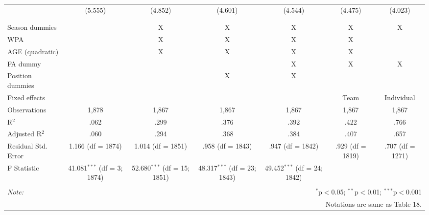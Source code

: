 \begin{table}[H]
\begin{tabular}{@{\extracolsep{5pt}}lcccccc}
  & (5.555) & (4.852) & (4.601) & (4.544) & (4.475) & (4.023) \\
  & & & & & & \\
\hline \\[-1.8ex]
Season dummies &  & X & X & X & X & X \\
WPA &  & X & X & X & X &  \\
AGE (quadratic) &  & X & X & X & X &  \\
FA dummy &  &  &  & X & X & X \\
Position dummies &  &  & X & X &  &  \\
Fixed effects &  &  &  &  & Team & Individual \\
Observations & 1,878 & 1,867 & 1,867 & 1,867 & 1,867 & 1,867 \\
R$^{2}$ & .062 & .299 & .376 & .392 & .422 & .766 \\
Adjusted R$^{2}$ & .060 & .294 & .368 & .384 & .407 & .657 \\
Residual Std. Error & 1.166 (df = 1874) & 1.014 (df = 1851) & .958 (df = 1843) & .947 (df = 1842) & .929 (df = 1819) & .707 (df = 1271) \\
F Statistic & 41.081$^{***}$ (df = 3; 1874) & 52.680$^{***}$ (df = 15; 1851) & 48.317$^{***}$ (df = 23; 1843) & 49.452$^{***}$ (df = 24; 1842) &  &  \\
\hline
\hline \\[-1.8ex]
\textit{Note:}  & \multicolumn{6}{r}{$^{*}$p$<$0.05; $^{**}$p$<$0.01; $^{***}$p$<$0.001} \\
& \multicolumn{6}{r}{Notations are same as Table 18.} \\
\end{tabular}
\end{table}
